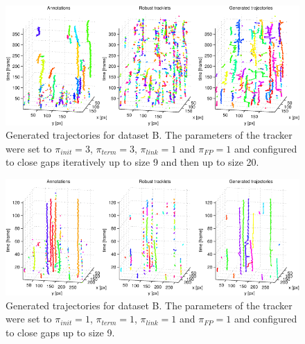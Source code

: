 \begin{figure}
	\includegraphics[width=\textwidth]{images/fig_results_tracker_dataset_4}
	\caption{Generated trajectories for dataset B. The parameters of the tracker were set to $\pi_{init}=3$, $\pi_{term}=3$, $\pi_{link}=1$ and $\pi_{FP}=1$ and configured to close gaps iteratively up to size 9 and then up to size 20.}
	\label{fig:fig_results_tracker_dataset_4}
\end{figure}
\begin{figure}
	\includegraphics[width=\textwidth]{images/fig_results_tracker_dataset_5}
	\caption{Generated trajectories for dataset B. The parameters of the tracker were set to $\pi_{init}=1$, $\pi_{term}=1$, $\pi_{link}=1$ and $\pi_{FP}=1$ and configured to close gaps up to size 9.}
	\label{fig:fig_results_tracker_dataset_5}
\end{figure}			